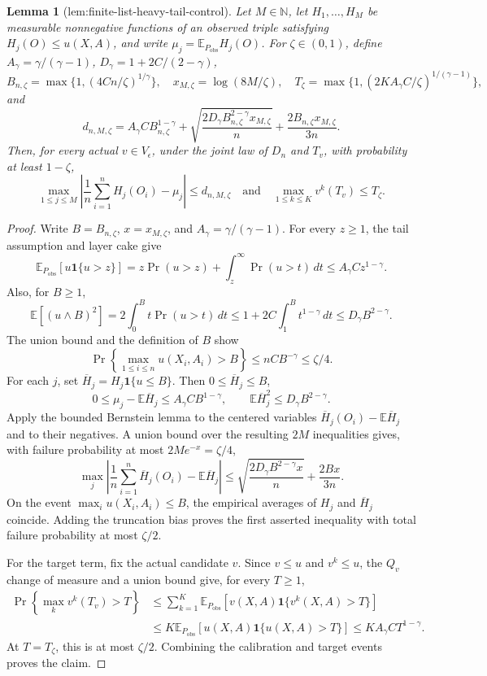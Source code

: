 \documentclass{article}
\newtheorem{lemma}{Lemma}
\begin{document}
\begin{lemma}[lem:finite-list-heavy-tail-control]\label{lem:finite-list-heavy-tail-control}
Let \(M\in\mathbb N\), let \(H_1,\ldots,H_M\) be measurable nonnegative functions of an observed triple satisfying \(H_j(O)\le u(X,A)\), and write \(\mu_j=\mathbb E_{P_{\mathrm{obs}}}H_j(O)\). For \(\zeta\in(0,1)\), define \(A_\gamma=\gamma/(\gamma-1)\), \(D_\gamma=1+2C/(2-\gamma)\), \[B_{n,\zeta}=\max\{1,(4Cn/\zeta)^{1/\gamma}\},\quad x_{M,\zeta}=\log(8M/\zeta),\quad T_\zeta=\max\{1,(2KA_\gamma C/\zeta)^{1/(\gamma-1)}\},\] and \[d_{n,M,\zeta}=A_\gamma C B_{n,\zeta}^{1-\gamma}+\sqrt{\frac{2D_\gamma B_{n,\zeta}^{2-\gamma}x_{M,\zeta}}{n}}+\frac{2B_{n,\zeta}x_{M,\zeta}}{3n}.\] Then, for every actual \(v\in V_\epsilon\), under the joint law of \(D_n\) and \(T_v\), with probability at least \(1-\zeta\), \[\max_{1\le j\le M}\left|\frac1n\sum_{i=1}^nH_j(O_i)-\mu_j\right|\le d_{n,M,\zeta}\quad\text{and}\quad\max_{1\le k\le K}v^k(T_v)\le T_\zeta.\]
\end{lemma}
\begin{proof}
Write \(B=B_{n,\zeta}\), \(x=x_{M,\zeta}\), and \(A_\gamma=\gamma/(\gamma-1)\). For every \(z\ge1\), the tail assumption and layer cake give
\[
\mathbb E_{P_{\mathrm{obs}}}[u\mathbf 1\{u>z\}]=z\Pr(u>z)+\int_z^\infty\Pr(u>t)\,dt\le A_\gamma C z^{1-\gamma}.
\]
Also, for \(B\ge1\),
\[
\mathbb E[(u\wedge B)^2]=2\int_0^B t\Pr(u>t)\,dt\le1+2C\int_1^B t^{1-\gamma}\,dt\le D_\gamma B^{2-\gamma}.
\]
The union bound and the definition of \(B\) show
\[
\Pr\left\{\max_{1\le i\le n}u(X_i,A_i)>B\right\}\le nCB^{-\gamma}\le\zeta/4.
\]
For each \(j\), set \(\overline H_j=H_j\mathbf 1\{u\le B\}\). Then \(0\le\overline H_j\le B\),
\[
0\le\mu_j-\mathbb E\overline H_j\le A_\gamma C B^{1-\gamma},\qquad \mathbb E\overline H_j^2\le D_\gamma B^{2-\gamma}.
\]
Apply the bounded Bernstein lemma to the centered variables \(\overline H_j(O_i)-\mathbb E\overline H_j\) and to their negatives. A union bound over the resulting \(2M\) inequalities gives, with failure probability at most \(2Me^{-x}=\zeta/4\),
\[
\max_j\left|\frac1n\sum_{i=1}^n\overline H_j(O_i)-\mathbb E\overline H_j\right|\le\sqrt{\frac{2D_\gamma B^{2-\gamma}x}{n}}+\frac{2Bx}{3n}.
\]
On the event \(\max_i u(X_i,A_i)\le B\), the empirical averages of \(H_j\) and \(\overline H_j\) coincide. Adding the truncation bias proves the first asserted inequality with total failure probability at most \(\zeta/2\).

For the target term, fix the actual candidate \(v\). Since \(v\le u\) and \(v^k\le u\), the \(Q_v\) change of measure and a union bound give, for every \(T\ge1\),
\[
\begin{aligned}
\Pr\left\{\max_k v^k(T_v)>T\right\}&\le\sum_{k=1}^K\mathbb E_{P_{\mathrm{obs}}}[v(X,A)\mathbf 1\{v^k(X,A)>T\}]\\
&\le K\mathbb E_{P_{\mathrm{obs}}}[u(X,A)\mathbf 1\{u(X,A)>T\}]\le KA_\gamma CT^{1-\gamma}.
\end{aligned}
\]
At \(T=T_\zeta\), this is at most \(\zeta/2\). Combining the calibration and target events proves the claim.
\end{proof}
\end{document}
